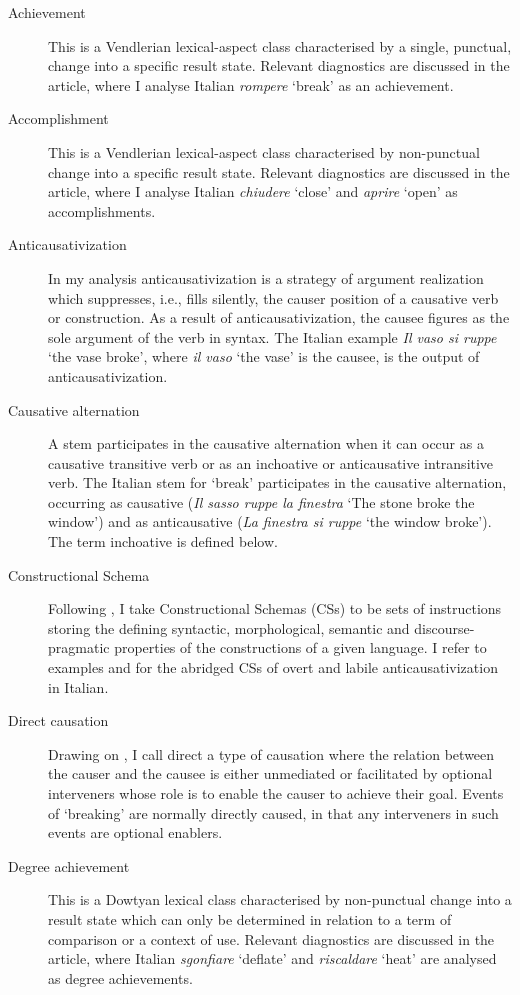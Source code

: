 \documentclass[output=paper,colorlinks,citecolor=brown
]{langscibook}
\begin{document}
\begin{description}
\item[Achievement] This is a Vendlerian   lexical-aspect class characterised by a single, punctual, change into a specific   result state. Relevant diagnostics are discussed in the article, where I   analyse Italian \textit{rompere} ‘break’ as an achievement.
\item[Accomplishment] This is a Vendlerian   lexical-aspect class characterised by non-punctual change into a specific result   state. Relevant diagnostics are discussed in the article, where I analyse Italian   \textit{chiudere} ‘close’ and \textit{aprire} ‘open’ as accomplishments.
\item[Anticausativization] In my analysis anticausativization   is a strategy of argument realization which suppresses, i.e., fills   silently, the causer position of a causative verb or construction. As a result of anticausativization,   the causee figures as the sole argument of the verb in syntax. The Italian example \textit{Il   vaso si ruppe} ‘the vase broke’, where \textit{il vaso} ‘the vase’ is the   causee, is the output of anticausativization.
\item[Causative   alternation] A stem participates in the causative   alternation when it can occur as a causative transitive verb or as an   inchoative or anticausative intransitive verb. The Italian stem for ‘break’   participates in the causative alternation, occurring as causative (\textit{Il sasso   ruppe la finestra} ‘The stone broke the window’) and as anticausative (\textit{La   finestra si ruppe} ‘the window broke’). The term inchoative   is defined below.
\item[Constructional   Schema] Following \citet{vanvalin2023principles}, I   take Constructional Sche\-mas (CSs) to be sets of instructions storing   the defining syntactic, morphological, semantic and discourse-pragmatic   properties of the constructions of a given language. I refer to examples    and  for the abridged CSs of overt and labile anticausativization in   Italian.
\item[Direct   causation] Drawing on \citet{wolff2003direct}, I call direct   a type of causation where the relation between the causer and the causee is   either unmediated or facilitated by optional interveners whose role is to   enable the causer to achieve their goal. Events of ‘breaking’ are normally   directly caused, in that any interveners in such events are optional   enablers.
\item[Degree   achievement] This is a Dowtyan lexical class   characterised by non\hyp punctual change into a result state which can only be   determined in relation to a term of comparison or a context of use. Relevant   diagnostics are discussed in the article, where Italian \textit{sgonfiare}   ‘deflate’ and \textit{riscaldare} ‘heat’ are analysed as degree achievements.

\end{description}
\end{document}
